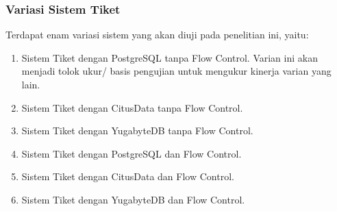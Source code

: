 \subsubsection{Variasi Sistem Tiket}

Terdapat enam variasi sistem yang akan diuji pada penelitian ini, yaitu:

\begin{enumerate}
    \item Sistem Tiket dengan PostgreSQL tanpa Flow Control. Varian ini akan menjadi tolok ukur/ basis pengujian untuk mengukur kinerja varian yang lain.
    \item Sistem Tiket dengan CitusData tanpa Flow Control.
    \item Sistem Tiket dengan YugabyteDB tanpa Flow Control.
    \item Sistem Tiket dengan PostgreSQL dan Flow Control.
    \item Sistem Tiket dengan CitusData dan Flow Control.
    \item Sistem Tiket dengan YugabyteDB dan Flow Control.
\end{enumerate}